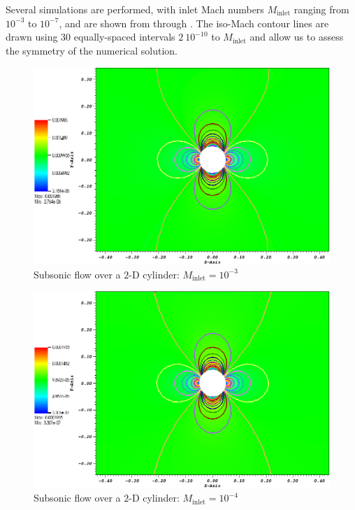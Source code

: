 Several simulations are performed, with inlet Mach numbers $M_{\text{inlet}}$ ranging from $10^{-3}$ to $10^{-7}$, and are shown from  through . The iso-Mach contour lines are drawn using 30 equally-spaced intervals $2 \ 10^{-10}$ to $M_{\text{inlet}}$ and allow us to assess the symmetry of the numerical solution.
%
        \begin{figure}[H]
                \centering
                \includegraphics[width=\textwidth]{figures/CylinderMach1em3ZoomIn.png}
                \caption{Subsonic flow over a $2$-D cylinder: $M_{\text{inlet}}=10^{-3}$}
                \label{fig:cyl_1em3}
        \end{figure}%

        \begin{figure}[H]
                \centering
                \includegraphics[width=\textwidth]{figures/CylinderMach1em4ZoomIn.png}
                \caption{Subsonic flow over a $2$-D cylinder: $M_{\text{inlet}}=10^{-4}$}
                \label{fig:cyl_1em4}
        \end{figure}    

